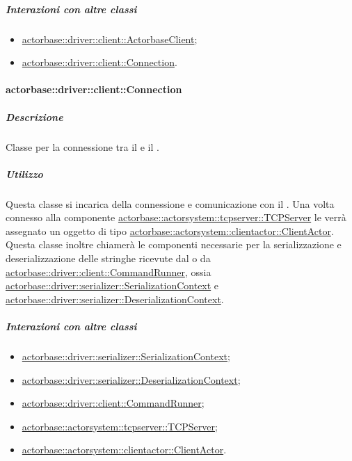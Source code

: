 \documentclass{scalatekids-article}
\begin{document}
\subparagraph{Interazioni con altre classi}

\begin{itemize}
\item \hyperref[sec:actorbase::driver::client::ActorbaseClient]{actorbase::driver::client::ActorbaseClient};
\item \hyperref[sec:actorbase::driver::client::Connection]{actorbase::driver::client::Connection}.
\end{itemize}

\paragraph{actorbase::driver::client::Connection}
\label{sec:actorbase::driver::client::Connection}

\subparagraph{Descrizione}

Classe per la connessione tra il  e il .

\subparagraph{Utilizzo}

Questa classe si incarica della connessione e comunicazione con il . Una volta
connesso alla componente \hyperref[sec:actorbase::actorsystem::tcpserver::TCPServer]{actorbase::actorsystem::\allowbreak{}tcpserver::\allowbreak{}TCPServer}
le verrà assegnato un oggetto di tipo \hyperref[sec:actorbase::actorsystem::clientactor::ClientActor]{actorbase::\allowbreak{}actorsystem::\allowbreak{}clientactor::\allowbreak{}ClientActor}.\\
Questa classe inoltre chiamerà le componenti necessarie per la serializzazione e deserializzazione
delle stringhe ricevute dal  o da \hyperref[sec:actorbase::driver::client::CommandRunner]{actorbase::\allowbreak{}driver::\allowbreak{}client::\allowbreak{}CommandRunner},
ossia \hyperref[sec:actorbase::driver::serializer::SerializationContext]{actorbase::\allowbreak{}driver::\allowbreak{}serializer::\allowbreak{}SerializationContext}
e \hyperref[sec:actorbase::driver::serializer::Deserializationtext]{actorbase::\allowbreak{}driver::\allowbreak{}serializer::\allowbreak{}DeserializationContext}.

\subparagraph{Interazioni con altre classi}
\begin{itemize}
\item \hyperref[sec:actorbase::driver::serializer::SerializationContext]{actorbase::driver::serializer::SerializationContext};
\item \hyperref[sec:actorbase::driver::serializer::Deserializationtext]{actorbase::driver::serializer::DeserializationContext};
\item \hyperref[sec:actorbase::driver::client::CommandRunner]{actorbase::driver::client::CommandRunner};
\item \hyperref[sec:actorbase::actorsystem::tcpserver::TCPServer]{actorbase::actorsystem::tcpserver::TCPServer};
\item \hyperref[sec:actorbase::actorbase::actorsystem::clientactor::ClientActor]{actorbase::actorsystem::clientactor::ClientActor}.
\end{itemize}
\end{document}
